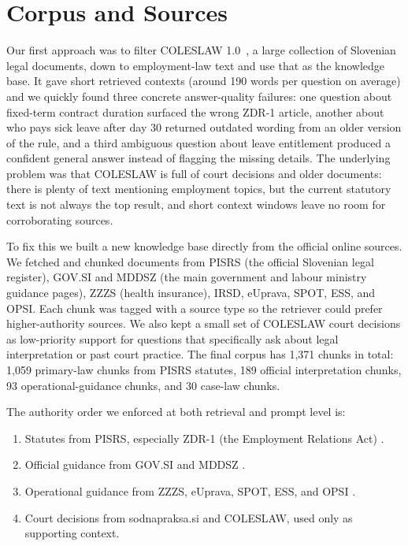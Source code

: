 \documentclass[fleqn,moreauthors,10pt]{ds_report}
\begin{document}
\section*{Corpus and Sources}

Our first approach was to filter COLESLAW 1.0~\cite{COLESLAW}, a large collection of Slovenian legal documents, down to employment-law text and use that as the knowledge base.
It gave short retrieved contexts (around 190 words per question on average) and we quickly found three concrete answer-quality failures: one question about fixed-term contract duration surfaced the wrong ZDR-1 article, another about who pays sick leave after day 30 returned outdated wording from an older version of the rule, and a third ambiguous question about leave entitlement produced a confident general answer instead of flagging the missing details.
The underlying problem was that COLESLAW is full of court decisions and older documents: there is plenty of text mentioning employment topics, but the current statutory text is not always the top result, and short context windows leave no room for corroborating sources.

To fix this we built a new knowledge base directly from the official online sources.
We fetched and chunked documents from PISRS (the official Slovenian legal register), GOV.SI and MDDSZ (the main government and labour ministry guidance pages), ZZZS (health insurance), IRSD, eUprava, SPOT, ESS, and OPSI.
Each chunk was tagged with a source type so the retriever could prefer higher-authority sources.
We also kept a small set of COLESLAW court decisions as low-priority support for questions that specifically ask about legal interpretation or past court practice.
The final corpus has 1,371 chunks in total: 1,059 primary-law chunks from PISRS statutes, 189 official interpretation chunks, 93 operational-guidance chunks, and 30 case-law chunks.

The authority order we enforced at both retrieval and prompt level is:
\begin{enumerate}
  \item Statutes from PISRS, especially ZDR-1 (the Employment Relations Act) \cite{PISRSZDR1}.
  \item Official guidance from GOV.SI and MDDSZ \cite{GovDelovnaRazmerja,GovMinimalnaPlaca}.
  \item Operational guidance from ZZZS, eUprava, SPOT, ESS, and OPSI \cite{ZZZSBolniska,OPSIKolektivne}.
  \item Court decisions from sodnapraksa.si and COLESLAW, used only as supporting context.
\end{enumerate}
\end{document}
